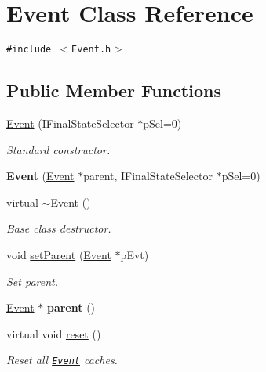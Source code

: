 \hypertarget{classEvent}{
\section{Event Class Reference}
\label{classEvent}
}
{\tt \#include $<$Event.h$>$}

\subsection*{Public Member Functions}
\begin{CompactItemize}
\item 
\hyperlink{classEvent_cf4f8ae50e55e8f5a270e5029c0eb58d}{Event} (IFinal\-State\-Selector $\ast$p\-Sel=0)
\begin{CompactList}\small\item\em Standard constructor. \item\end{CompactList}\item 
\hypertarget{classEvent_0d9a5821a74edd8e0cf21e84744bac83}{
\textbf{Event} (\hyperlink{classEvent}{Event} $\ast$parent, IFinal\-State\-Selector $\ast$p\-Sel=0)}
\label{classEvent_0d9a5821a74edd8e0cf21e84744bac83}

\item 
\hypertarget{classEvent_881b105052e43714848f85bf5439fdb8}{
virtual \hyperlink{classEvent_881b105052e43714848f85bf5439fdb8}{$\sim$Event} ()}
\label{classEvent_881b105052e43714848f85bf5439fdb8}

\begin{CompactList}\small\item\em Base class destructor. \item\end{CompactList}\item 
\hypertarget{classEvent_f708ec288ea908a24c6da64ba2b1b4d1}{
void \hyperlink{classEvent_f708ec288ea908a24c6da64ba2b1b4d1}{set\-Parent} (\hyperlink{classEvent}{Event} $\ast$p\-Evt)}
\label{classEvent_f708ec288ea908a24c6da64ba2b1b4d1}

\begin{CompactList}\small\item\em Set parent. \item\end{CompactList}\item 
\hypertarget{classEvent_ee92420fb0d540eb40390ab6d9b70788}{
\hyperlink{classEvent}{Event} $\ast$ \textbf{parent} ()}
\label{classEvent_ee92420fb0d540eb40390ab6d9b70788}

\item 
virtual void \hyperlink{classEvent_d038b2da9c6d712e704e7c07ff3bf580}{reset} ()
\begin{CompactList}\small\item\em Reset all {\tt \hyperlink{classEvent}{Event}} caches. \item\end{CompactList}\end{CompactItemize}
